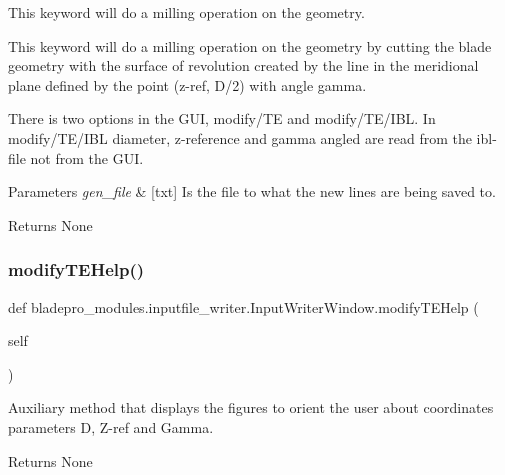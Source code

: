 This keyword will do a milling operation on the geometry. 

This keyword will do a milling operation on the geometry by cutting the blade geometry with the surface of revolution created by the line in the meridional plane defined by the point (z-\/ref, D/2) with angle gamma.

There is two options in the G\+UI, modify/\+TE and modify/\+T\+E/\+I\+BL. In modify/\+T\+E/\+I\+BL diameter, z-\/reference and gamma angled are read from the ibl-\/file not from the G\+UI.


\begin{DoxyParams}{Parameters}
{\em gen\+\_\+file} & \mbox{[}txt\mbox{]} Is the file to what the new lines are being saved to. \\
\hline
\end{DoxyParams}
\begin{DoxyReturn}{Returns}
None 
\end{DoxyReturn}
\hypertarget{a00073_a0894116159595156b62859c796bdea1d}{}\label{a00073_a0894116159595156b62859c796bdea1d} 
\subsubsection{\texorpdfstring{modify\+T\+E\+Help()}{modifyTEHelp()}}
{\footnotesize\ttfamily def bladepro\+\_\+modules.\+inputfile\+\_\+writer.\+Input\+Writer\+Window.\+modify\+T\+E\+Help (\begin{DoxyParamCaption}\item[{}]{self }\end{DoxyParamCaption})}



Auxiliary method that displays the figures to orient the user about coordinates parameters D, Z-\/ref and Gamma. 

\begin{DoxyReturn}{Returns}
None 
\end{DoxyReturn}
\hypertarget{a00073_af311095fe10adcca5237385033dfe67b}{}\label{a00073_af311095fe10adcca5237385033dfe67b} 
